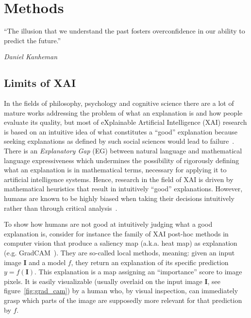 \chapter{Methods}
\label{chap:methods}

\epigraph{\enquote{The illusion that we understand the past fosters overconfidence in our ability to predict the future.}}{\emph{Daniel Kanheman}}

\section{Limits of XAI}
\label{sec:limits of XAI}
In the fields of philosophy, psychology and cognitive science there are a lot of mature works addressing the problem of what an explanation is and how people evaluate its quality, but most of eXplainable Artificial Intelligence (XAI) research is based on an intuitive idea of what constitutes a “good” explanation because seeking explanations as defined by such social sciences would lead to failure~\cite{Miller}.
There is an \textit{Explanatory Gap} (EG) between natural language and mathematical language expressiveness which undermines the possibility of rigorously defining what an explanation is in mathematical terms, necessary for applying it to artificial intelligence systems.
Hence, research in the field of XAI is driven by mathematical heuristics that result in intuitively “good” explanations.
However, humans are known to be highly biased when taking their decisions intuitively rather than through critical analysis~\cite{Kahneman}. 

To show how humans are not good at intuitively judging what a good explanation is, consider for instance the family of XAI post-hoc methods in computer vision that produce a saliency map (a.k.a. heat map) as explanation (e.g. GradCAM~\cite{GradCAM}).
They are so-called local methods, meaning: given an input image $\mathbf{I}$ and a model $f$, they return an explanation of its specific prediction $y = f(\mathbf{I})$.
This explanation is a map assigning an “importance” score to image pixels.
It is easily visualizable (usually overlaid on the input image $\mathbf{I}$, see figure~\ref{fig:grad_cam}) by a human who, by visual inspection, can immediately grasp which parts of the image are supposedly more relevant for that prediction by $f$.

